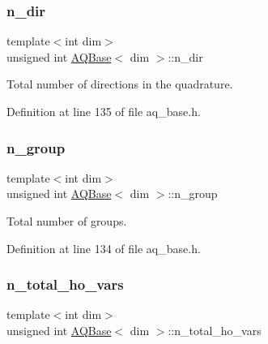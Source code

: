 \subsubsection{\texorpdfstring{n\+\_\+dir}{n\_dir}}
{\footnotesize\ttfamily template$<$int dim$>$ \\
unsigned int \hyperlink{class_a_q_base}{A\+Q\+Base}$<$ dim $>$\+::n\+\_\+dir\hspace{0.3cm}{\ttfamily [protected]}}



Total number of directions in the quadrature. 



Definition at line 135 of file aq\+\_\+base.\+h.

\mbox{\label{class_a_q_base_a07b0839db1844f879f3d9c7d7014fb7f}} 
\subsubsection{\texorpdfstring{n\+\_\+group}{n\_group}}
{\footnotesize\ttfamily template$<$int dim$>$ \\
unsigned int \hyperlink{class_a_q_base}{A\+Q\+Base}$<$ dim $>$\+::n\+\_\+group\hspace{0.3cm}{\ttfamily [protected]}}



Total number of groups. 



Definition at line 134 of file aq\+\_\+base.\+h.

\mbox{\label{class_a_q_base_a7169f8e3b53059317bb2144519f64be9}} 
\subsubsection{\texorpdfstring{n\+\_\+total\+\_\+ho\+\_\+vars}{n\_total\_ho\_vars}}
{\footnotesize\ttfamily template$<$int dim$>$ \\
unsigned int \hyperlink{class_a_q_base}{A\+Q\+Base}$<$ dim $>$\+::n\+\_\+total\+\_\+ho\+\_\+vars\hspace{0.3cm}{\ttfamily [protected]}}



